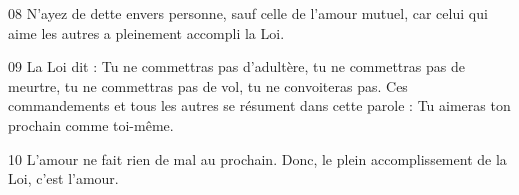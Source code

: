 
08 N’ayez de dette envers personne, sauf celle de l’amour mutuel, car celui qui aime les autres a pleinement accompli la Loi.

09 La Loi dit : Tu ne commettras pas d’adultère, tu ne commettras pas de meurtre, tu ne commettras pas de vol, tu ne convoiteras pas. Ces commandements et tous les autres se résument dans cette parole : Tu aimeras ton prochain comme toi-même.

10 L’amour ne fait rien de mal au prochain. Donc, le plein accomplissement de la Loi, c’est l’amour.